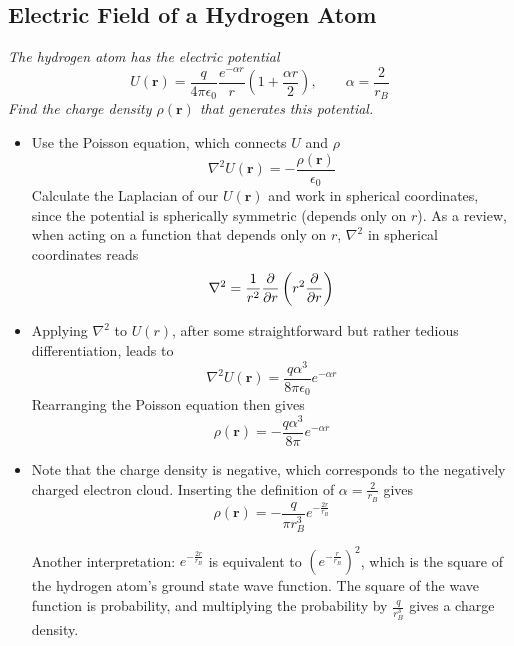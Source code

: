 \documentclass[11pt, a4paper]{article}
\renewcommand{\vec}[1]{\bm{#1}} %
\renewcommand{\r}{\vec{r}}
\newcommand{\ee}{\epsilon_{0}}  %
\begin{document}
\subsection{Electric Field of a Hydrogen Atom}
\textit{The hydrogen atom has the electric potential}
\begin{equation*}
	U(\r) = \frac{q}{4\pi \ee} \frac{e^{-\alpha r}}{r}\left(1 + \frac{\alpha r}{2}\right), \qquad \alpha = \frac{2}{r_{B}}
\end{equation*}
\textit{Find the charge density $ \rho(\r) $ that generates this potential.}
\begin{itemize}
	\item Use the Poisson equation, which connects $ U $ and $ \rho $
	\begin{equation*}
		\nabla^{2}U(\r) = - \frac{\rho(\r)}{\ee}
	\end{equation*}
	Calculate the Laplacian of our $ U(\r) $ and work in spherical coordinates, since the potential is spherically symmetric (depends only on $ r $). As a review, when acting on a function that depends only on $ r $, $ \nabla^{2} $ in spherical coordinates reads
	\begin{equation*}
		\nabla^{2} = \frac{1}{r^{2}} \pdv{}{r}\left(r^{2} \pdv{}{r}\right)
	\end{equation*}
	
	\item Applying $ \nabla^{2} $ to $ U(r) $, after some straightforward but rather tedious differentiation, leads to
	\begin{equation*}
		\nabla^{2}U(\r) = \frac{q\alpha^{3}}{8 \pi \ee}e^{-\alpha r}
	\end{equation*}
	Rearranging the Poisson equation then gives
	\begin{equation*}
		\rho(\r) = - \frac{q\alpha^{3}}{8 \pi}e^{-\alpha r}
	\end{equation*}
	
	\item Note that the charge density is negative, which corresponds to the negatively charged electron cloud. Inserting the definition of $ \alpha = \frac{2}{r_{B}}$ gives
	\begin{equation*}
		\rho(\r) = -\frac{q}{\pi r_{B}^{3}} e^{-\frac{2r}{r_{B}}}
	\end{equation*}
	
	Another interpretation: $ e^{-\frac{2r}{r_{B}}} $ is equivalent to $ \left(e^{-\frac{r}{r_{B}}}\right)^{2} $, which is the square of the hydrogen atom's ground state wave function. The square of the wave function is probability, and multiplying the probability by $ \frac{q}{r_{B}^{3}} $ gives a charge density. 
	

\end{itemize}
\end{document}
